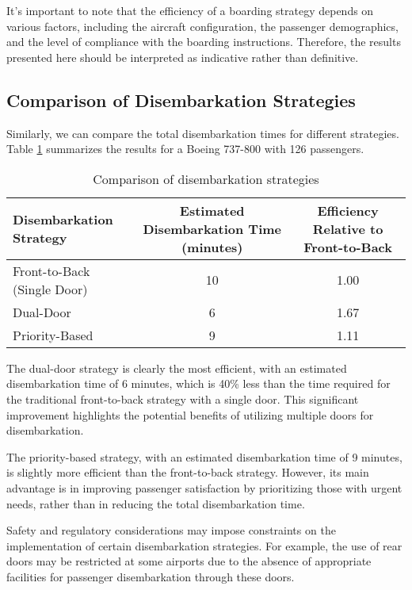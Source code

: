 \documentclass[12pt,a4paper]{article}
\begin{document}
It's important to note that the efficiency of a boarding strategy depends on various factors, including the aircraft configuration, the passenger demographics, and the level of compliance with the boarding instructions. Therefore, the results presented here should be interpreted as indicative rather than definitive.

\subsection{Comparison of Disembarkation Strategies}

Similarly, we can compare the total disembarkation times for different strategies. Table \ref{tab:disembarkation_comparison} summarizes the results for a Boeing 737-800 with 126 passengers.

\begin{table}[H]
\centering
\begin{tabular}{|l|c|c|}
\hline
\textbf{Disembarkation Strategy} & \textbf{Estimated Disembarkation Time (minutes)} & \textbf{Efficiency Relative to Front-to-Back} \\ \hline
Front-to-Back (Single Door) & 10 & 1.00 \\ \hline
Dual-Door & 6 & 1.67 \\ \hline
Priority-Based & 9 & 1.11 \\ \hline
\end{tabular}
\caption{Comparison of disembarkation strategies}
\label{tab:disembarkation_comparison}
\end{table}

The dual-door strategy is clearly the most efficient, with an estimated disembarkation time of 6 minutes, which is 40\% less than the time required for the traditional front-to-back strategy with a single door. This significant improvement highlights the potential benefits of utilizing multiple doors for disembarkation.

The priority-based strategy, with an estimated disembarkation time of 9 minutes, is slightly more efficient than the front-to-back strategy. However, its main advantage is in improving passenger satisfaction by prioritizing those with urgent needs, rather than in reducing the total disembarkation time.

Safety and regulatory considerations may impose constraints on the implementation of certain disembarkation strategies. For example, the use of rear doors may be restricted at some airports due to the absence of appropriate facilities for passenger disembarkation through these doors.
\end{document}
